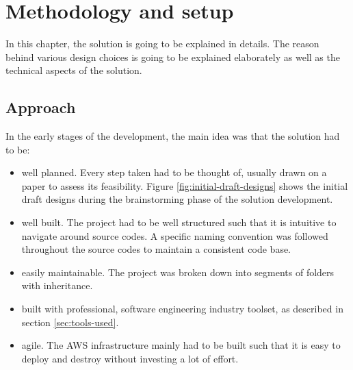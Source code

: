 


\chapter{Methodology and setup}
\label{chap:methodology-and-setup}

In this chapter, the solution is going to be explained in details. The reason behind various design choices is going to be explained elaborately as well as the technical aspects of the solution.


\section{Approach}
\label{sec:approach}

In the early stages of the development, the main idea was that the solution had to be:

\begin{itemize}
    \item well planned. Every step taken had to be thought of, usually drawn on a paper to assess its feasibility. Figure \ref{fig:initial-draft-designs} shows the initial draft designs during the brainstorming phase of the solution development.
    \item well built. The project had to be well structured such that it is intuitive to navigate around source codes. A specific naming convention was followed throughout the source codes to maintain a consistent code base.
    \item easily maintainable. The project was broken down into segments of folders with inheritance.
    \item built with professional, software engineering industry toolset, as described in section \ref{sec:tools-used}.
    \item agile. The AWS infrastructure mainly had to be built such that it is easy to deploy and destroy without investing a lot of effort.
\end{itemize}

